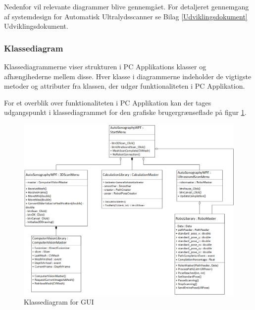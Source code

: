 Nedenfor vil relevante diagrammer blive gennemgået. For detaljeret gennemgang af systemdesign for Automatisk Ultralydsscanner se Bilag  \ref{Udviklingsdokument} Udviklingsdokument.

\subsubsection{Klassediagram}
Klassediagrammerne viser strukturen i PC Applikations klasser og afhængihederne mellem disse. Hver klasse i diagrammerne indeholder de vigtigste metoder og attributer fra klassen, der udgør funktionaliteten i PC Applikation. 

For et overblik over funktionaliteten i PC Applikation kan der tages udgangspunkt i klassediagrammet for den grafiske brugergrænseflade på figur \ref{class_gui}.

\begin{figure}[H]
    \centering
    \includegraphics[width=1\textwidth]{figurer/d/Design/Class/uml_class_gui}
    \caption{Klassediagram for GUI}
    \label{class_gui}
\end{figure}

\newpage

